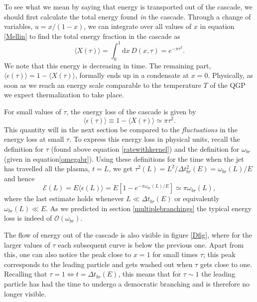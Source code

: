 \documentclass[a4paper,12pt]{article}
\numberwithin{equation}{section}
\begin{document}
To see what we mean by saying that energy is transported out of the cascade, we should first calculate the total energy found \emph{in} the cascade. Through a change of variables, $u=x/(1-x)$, we can integrate over all values of $x$ in equation \eqref{Mellin} to find the total energy fraction in the cascade as
\begin{equation}\label{X}
\langle X(\tau)\rangle=\int_0^1 \mathrm{d}x\, D(x,\tau) = e^{-\pi\tau^2}.
\end{equation}
We note that this energy is decreasing in time. The remaining part, $\langle \epsilon (\tau) \rangle = 1- \langle X(\tau)\rangle$, formally ends up in a condensate at $x=0$. Physically, as soon as we reach an energy scale comparable to the temperature $T$ of the QGP we expect thermalization to take place.

For small values of $\tau$, the energy loss of the cascade is given by
\begin{equation}\label{epsilon}
 \langle \epsilon(\tau) \rangle \equiv 1- \langle X(\tau)\rangle \simeq \pi \tau^2.
\end{equation}
This quantity will in the next section be compared to the \emph{fluctuations} in the energy loss at small $\tau$. To express this energy loss in physical units, recall the definition for $\tau$ (found above equation \eqref{ratewithkernel}) and the definition for $\omega_{br}$ (given in equation\eqref{omegabr}). Using these definitions for the time when the jet has travelled all the plasma, $t=L$, we get $\tau^2(L)=L^2/\Delta t^2_{br}(E)=\omega_{br}(L)/E$ and hence 
\begin{equation}
\mathcal{E}(L)=E\langle \epsilon(L) \rangle = E \left[ 1-e^{-\pi {\omega_{br}(L)}/{E}} \right] \simeq \pi \omega_{br}(L),
\end{equation}
where the last estimate holds whenever $L\ll \Delta t_{br}(E)$ or equivalently $\omega_{br}(L) \ll E$. As we predicted in section \ref{multiplebranchings} the typical energy loss is indeed of $\mathcal{O}(\omega_{br})$.


The flow of energy out of the cascade is also visible in figure \ref{Dfig}, where for the larger values of $\tau$ each subsequent curve is below the previous one. Apart from this, one can also notice the peak close to $x=1$ for small times $\tau$; this peak corresponds to the leading particle and gets washed out when $\tau$ gets close to one. Recalling that $\tau=1 \Leftrightarrow t=\Delta t_{br}(E)$, this means that for $\tau \sim 1$ the leading particle has had the time to undergo a democratic branching and is therefore no longer visible.
\end{document}
